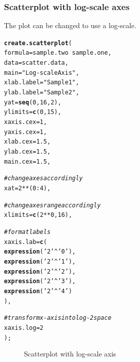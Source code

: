 \documentclass[letterpaper]{report}\usepackage[]{graphicx}\usepackage[]{color}
\makeatletter
\newcommand{\hlnum}[1]{\textcolor[rgb]{0.686,0.059,0.569}{#1}}%
\newcommand{\hlstr}[1]{\textcolor[rgb]{0.192,0.494,0.8}{#1}}%
\newcommand{\hlcom}[1]{\textcolor[rgb]{0.678,0.584,0.686}{\textit{#1}}}%
\newcommand{\hlopt}[1]{\textcolor[rgb]{0,0,0}{#1}}%
\newcommand{\hlstd}[1]{\textcolor[rgb]{0.345,0.345,0.345}{#1}}%
\newcommand{\hlkwc}[1]{\textcolor[rgb]{0.333,0.667,0.333}{#1}}%
\newcommand{\hlkwd}[1]{\textcolor[rgb]{0.737,0.353,0.396}{\textbf{#1}}}%
\newenvironment{kframe}{%
 \def\at@end@of@kframe{}%
 \ifinner\ifhmode%
  \def\at@end@of@kframe{\end{minipage}}%
  \begin{minipage}{\columnwidth}%
 \fi\fi%
 \def\FrameCommand##1{\hskip\@totalleftmargin \hskip-\fboxsep
 \colorbox{shadecolor}{##1}\hskip-\fboxsep
     \hskip-\linewidth \hskip-\@totalleftmargin \hskip\columnwidth}%
 \MakeFramed {\advance\hsize-\width
   \@totalleftmargin\z@ \linewidth\hsize
   \@setminipage}}%
 {\par\unskip\endMakeFramed%
 \at@end@of@kframe}
\newenvironment{knitrout}{}{} %
\makeatother
\begin{document}
\subsubsection{Scatterplot with log-scale axes}
The plot can be changed to use a log-scale. 
\begin{knitrout}
\color{fgcolor}\begin{kframe}
\begin{alltt}
\hlkwd{create.scatterplot}\hlstd{(}
    \hlkwc{formula} \hlstd{= sample.two} \hlopt{~} \hlstd{sample.one,}
    \hlkwc{data} \hlstd{= scatter.data,}
    \hlkwc{main} \hlstd{=} \hlstr{"Log-scale Axis"}\hlstd{,}
    \hlkwc{xlab.label} \hlstd{=} \hlstr{"Sample 1"}\hlstd{,}
    \hlkwc{ylab.label} \hlstd{=} \hlstr{"Sample 2"}\hlstd{,}
    \hlkwc{yat} \hlstd{=} \hlkwd{seq}\hlstd{(}\hlnum{0}\hlstd{,} \hlnum{16}\hlstd{,} \hlnum{2}\hlstd{),}
    \hlkwc{ylimits} \hlstd{=} \hlkwd{c}\hlstd{(}\hlnum{0}\hlstd{,} \hlnum{15}\hlstd{),}
    \hlkwc{xaxis.cex} \hlstd{=} \hlnum{1}\hlstd{,}
    \hlkwc{yaxis.cex} \hlstd{=} \hlnum{1}\hlstd{,}
    \hlkwc{xlab.cex} \hlstd{=} \hlnum{1.5}\hlstd{,}
    \hlkwc{ylab.cex} \hlstd{=} \hlnum{1.5}\hlstd{,}
    \hlkwc{main.cex} \hlstd{=} \hlnum{1.5}\hlstd{,}

    \hlcom{# change axes accordingly }
    \hlkwc{xat} \hlstd{=} \hlnum{2} \hlopt{**} \hlstd{(}\hlnum{0}\hlopt{:}\hlnum{4}\hlstd{),}

    \hlcom{# change axes range accordingly}
    \hlkwc{xlimits} \hlstd{=} \hlkwd{c}\hlstd{(}\hlnum{2} \hlopt{**} \hlnum{0}\hlstd{,}\hlnum{16}\hlstd{),}

    \hlcom{# format labels}
    \hlkwc{xaxis.lab} \hlstd{=} \hlkwd{c}\hlstd{(}
        \hlkwd{expression}\hlstd{(}\hlstr{'2'}\hlopt{^}\hlstr{'0'}\hlstd{),}
        \hlkwd{expression}\hlstd{(}\hlstr{'2'}\hlopt{^}\hlstr{'1'}\hlstd{),}
        \hlkwd{expression}\hlstd{(}\hlstr{'2'}\hlopt{^}\hlstr{'2'}\hlstd{),}
        \hlkwd{expression}\hlstd{(}\hlstr{'2'}\hlopt{^}\hlstr{'3'}\hlstd{),}
        \hlkwd{expression}\hlstd{(}\hlstr{'2'}\hlopt{^}\hlstr{'4'}\hlstd{)}
        \hlstd{),}

    \hlcom{# transform x-axis into log-2 space}
    \hlkwc{xaxis.log} \hlstd{=} \hlnum{2}
    \hlstd{);}
\end{alltt}
\end{kframe}\begin{figure}

{\centering {} 

}

\caption[Scatterplot with log-scale axis]{Scatterplot with log-scale axis}\label{fig:scatter3}
\end{figure}


\end{knitrout}
\end{document}
